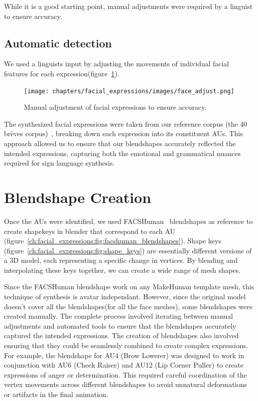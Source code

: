 \documentclass[../../main]{subfiles}
\begin{document}
While it is a good starting point, manual adjustments were required by a linguist to ensure accuracy.

\subsection{Automatic detection}
\label{ch:facial_expressions:action_unit_analysis:automatic_detection}

We used a linguists input by adjusting the movements of individual facial features for each expression(figure~\ref{ch:facial_expressions:fig:face_adjust}).

\begin{figure}
    \centering
    \texttt{[image: chapters/facial\_expressions/images/face\_adjust.png]}
    \caption{Manual adjustment of facial expressions to ensure accuracy.}
    \label{ch:facial_expressions:fig:face_adjust}
\end{figure}

The synthesized facial expressions were taken from our reference corpus (the 40 brèves corpus)~\cite{challant2024extending, challant2022first}, breaking down each expression into its constituent AUs. This approach allowed us to ensure that our blendshapes accurately reflected the intended expressions, capturing both the emotional and grammatical nuances required for sign language synthesis.

\section{Blendshape Creation}
\label{ch:facial_expressions:blendshape_creation}

Once the AUs were identified, we used FACSHuman~\cite{gilbert2021facshuman} blendshapes as reference to create shapekeys in blender that correspond to each AU (figure~\ref{ch:facial_expressions:fig:facshuman_blendshapes}). Shape keys (figure~\ref{ch:facial_expressions:fig:shape_keys}) are essentially different versions of a 3D model, each representing a specific change in vertices. By blending and interpolating these keys together, we can create a wide range of mesh shapes.

Since the FACSHuman blendshape work on any MakeHuman template mesh, this technique of synthesis is avatar independant. However, since the original model doesn't cover all the blendshapes(for all the face meshes), some blendshapes were created manually. The complete process involved iterating between manual adjustments and automated tools to ensure that the blendshapes accurately captured the intended expressions. The creation of blendshapes also involved ensuring that they could be seamlessly combined to create complex expressions. For example, the blendshape for AU4 (Brow Lowerer) was designed to work in conjunction with AU6 (Cheek Raiser) and AU12 (Lip Corner Puller) to create expressions of anger or determination. This required careful coordination of the vertex movements across different blendshapes to avoid unnatural deformations or artifacts in the final animation.
\end{document}
